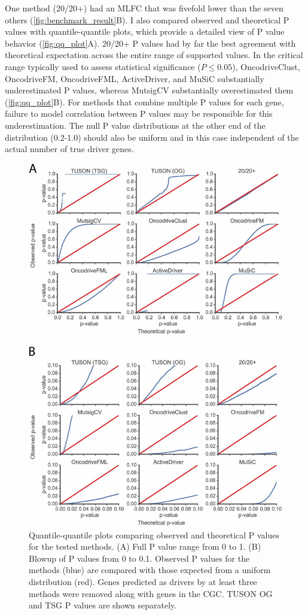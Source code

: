 One method (20/20+) had an MLFC that was fivefold lower than the seven others (\autoref{fig:benchmark_result}B). I also compared observed and theoretical P values with quantile-quantile plots, which provide a detailed view of P value behavior (\autoref{fig:qq_plot}A). 20/20+ P values had by far the best agreement with theoretical expectation across the entire range of supported values. In the critical range typically used to assess statistical significance ($P \leq 0.05$), OncodriveClust, OncodriveFM, OncodriveFML, ActiveDriver, and MuSiC substantially underestimated P values, whereas MutsigCV substantially overestimated them (\autoref{fig:qq_plot}B). For methods that combine multiple P values for each gene, failure to model correlation between P values may be responsible for this underestimation. The null P value distributions at the other end of the distribution (0.2-1.0) should also be uniform and in this case independent of the actual number of true driver genes.

\begin{figure}
  \centering
  \makeatletter
  \let\@currsize\normalsize
  \includegraphics[width=0.9\linewidth]{figures/chapter4/qq_plots.jpg}
  \caption{Quantile-quantile plots comparing observed and theoretical P values for the tested methods. (A) Full P value range from 0 to 1. (B) Blowup of P values from 0 to 0.1. Observed P values for the methods (blue) are compared with those expected from a uniform distribution (red). Genes predicted as drivers by at least three methods were removed along with genes in the CGC. TUSON OG and TSG P values are shown separately.}
  \label{fig:qq_plot}
\end{figure}

